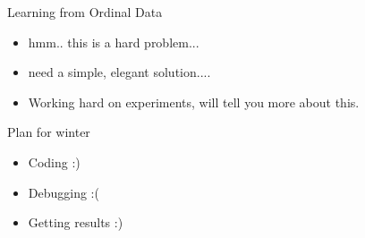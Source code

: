 \documentclass[mathserif, handout]{beamer}
\begin{document}
\begin{frame}{Learning from Ordinal Data}
\begin{itemize}
\item hmm.. this is a hard problem...
\item need a simple, elegant solution....
\item Working hard on experiments, will tell you more about this.
\end{itemize}

\end{frame}

\begin{frame}{Plan for winter}
\begin{itemize}
    \item Coding :)
    \item Debugging :(
    \item Getting results :)
\end{itemize}

\end{frame}


\end{document}
